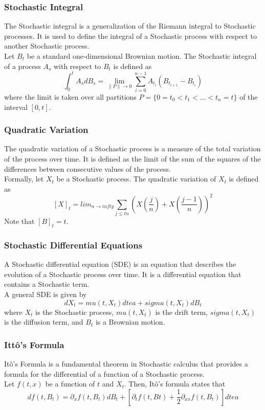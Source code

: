\documentclass{beamer}
\begin{document}
\begin{frame}
    \frametitle{Stochastic Integral}
    The Stochastic integral is a generalization of the Riemann integral to Stochastic processes. It is used to define the integral of a Stochastic process with respect to another Stochastic process.\\
    \vspace{0.5cm}
    Let $B_t$ be a standard one-dimensional Brownian motion. The Stochastic integral of a process $A_s$ with respect to $B_t$ is defined as
    $$\int_{0}^{t} A_s dB_s = \lim_{\|P\| \to 0} \sum_{i=0}^{n-1} A_{t_{i}} (B_{t_{i+1}} - B_{t_{i}})$$
    where the limit is taken over all partitions $P = \{0 = t_0 < t_1 < \ldots < t_n = t\}$ of the interval $[0,t]$.
\end{frame}

\begin{frame}
    \frametitle{Quadratic Variation}
    The quadratic variation of a Stochastic process is a measure of the total variation of the process over time. It is defined as the limit of the sum of the squares of the differences between consecutive values of the process.\\
    \vspace{0.5cm}
    Formally, let $X_t$ be a Stochastic process. The quadratic variation of $X_t$ is defined as
    $$[X]_t = lim_{n \rightarrow infty} \sum_{j \leq tn} (X(\frac{j}{n}) + X(\frac{j-1}{n}) )^2 $$
    Note that $[B]_t = t$.
\end{frame}

\begin{frame}
    \frametitle{Stochastic Differential Equations}
    A Stochastic differential equation (SDE) is an equation that describes the evolution of a Stochastic process over time. It is a differential equation that contains a Stochastic term.\\
    \vspace{0.5cm}
    A general SDE is given by
    $$dX_t = mu(t,X_t) dtea + sigma(t,X_t) dB_t$$
    where $X_t$ is the Stochastic process, $mu(t,X_t)$ is the drift term, $sigma(t,X_t)$ is the diffusion term, and $B_t$ is a Brownian motion.
\end{frame}


\begin{frame}
    \frametitle{Ittô's Formula}
    Itô's Formula is a fundamental theorem in Stochastic calculus that provides a formula for the differential of a function of a Stochastic process.\\
    \vspace{0.5cm}
    Let $f(t, x)$ be a function of $t$ and $X_t$. Then, Itô's formula states that
    $$df(t,B_t) = \partial_x f(t,B_t) dB_t + [\partial_t f(t,Bt) + \frac{1}{2}\partial_{xx}f(t,B_t)]dtea $$

\end{frame}
\end{document}
